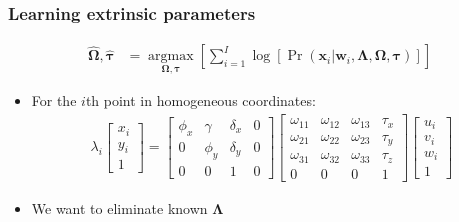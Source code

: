 \documentclass{beamer}
\begin{document}
\begin{frame}
  \frametitle{Learning extrinsic parameters}
  \begin{align*}
    \boldsymbol{\hat{\Omega}},\bm{\hat{\tau}} &=
    \underset{\boldsymbol{\Omega},\bm{\tau}}
    {\operatorname{argmax}} \left[
      \sum_{i=1}^I \log{\left[
    \Pr(\mathbf{x}_i|\mathbf{w}_i,\boldsymbol{\Lambda},\boldsymbol{\Omega},
    \bm{\tau})
      \right]}
    \right]
  \end{align*}
  \pause
  \begin{itemize}
    \item For the $i$th point in homogeneous coordinates:
    \begin{align*}
      \lambda_i \begin{bmatrix}
        x_i \\ y_i \\ 1
      \end{bmatrix} =
      \begin{bmatrix}
        \phi_x & \gamma & \delta_x & 0 \\
        0 & \phi_y & \delta_y & 0 \\
        0 & 0 & 1 & 0
      \end{bmatrix}
      \begin{bmatrix}
        \omega_{11} & \omega_{12} & \omega_{13} & \tau_x \\
        \omega_{21} & \omega_{22} & \omega_{23} & \tau_y \\
        \omega_{31} & \omega_{32} & \omega_{33} & \tau_z \\
        0 & 0 & 0 & 1
      \end{bmatrix} \begin{bmatrix}
        u_i \\ v_i \\ w_i \\ 1
      \end{bmatrix}
      \end{align*}
      \pause
    \item We want to eliminate known $\boldsymbol{\Lambda}$
  \end{itemize}
\end{frame}
\end{document}
